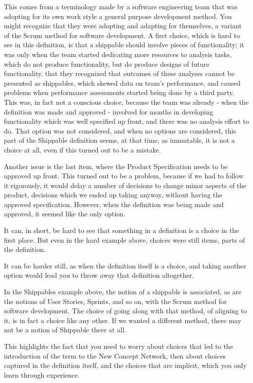 \documentclass[graybox,envcountchap,sectrefs]{svmono}
\newcommand{\ncnf}{New Concept Network}
\begin{document}
This comes from a terminology made by a software engineering team that was adopting for its own work style a general purpose development method. You might recognize that they were adopting and adapting for themselves, a variant of the Scrum method for software development. A first choice, which is hard to see in this definition, is that a shippable should involve pieces of functionality; it was only when the team started dedicating more resources to analysis tasks, which do not produce functionality, but do produce designs of future functionality, that they recognized that outcomes of these analyses cannot be presented as shippables, which skewed data on team's performance, and caused problems when performance assessments started being done by a third party. This was, in fact not a conscious choice, because the team was already - when the definition was made and approved - involved for months in developing functionality which was well specified up front, and there was no analysis effort to do. That option was not considered, and when no options are considered, this part of the Shippable definition seems, at that time, as immutable, it is not a choice at all, even if this turned out to be a mistake.

Another issue is the last item, where the Product Specification needs to be approved up front. This turned out to be a problem, because if we had to follow it rigorously, it would delay a number of decisions to change minor aspects of the product, decisions which we ended up taking anyway, without having the approved specification. However, when the definition was being made and approved, it seemed like the only option.

It can, in short, be hard to see that something in a definition is a choice in the first place. But even in the hard example above, choices were still items, parts of the definition.

It can be harder still, as when the definition itself is a choice, and taking another option would lead you to throw away that definition altogether.

In the Shippables example above, the notion of a shippable is associated, as are the notions of User Stories, Sprints, and so on, with the Scrum method for software development. The choice of going along with that method, of aligning to it, is in fact a choice like any other. If we wanted a different method, there may not be a notion of Shippable there at all.

This highlights the fact that you need to worry about choices that led to the introduction of the term to the \ncnf{}, then about choices captured in the definition itself, and the choices that are implicit, which you only learn through experience.
\end{document}
